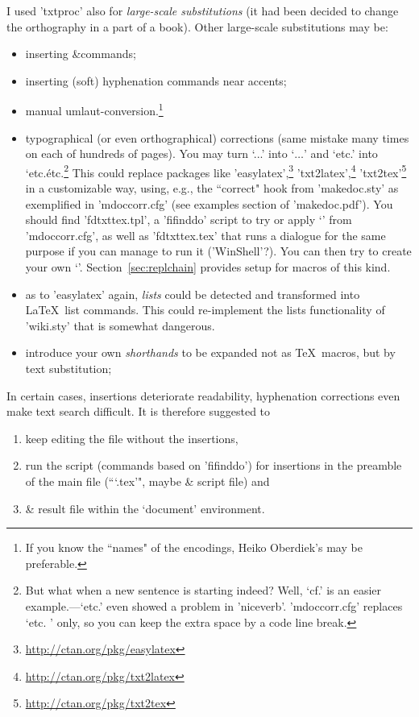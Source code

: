 \documentclass[fleqn]{article}
\begin{document}
I used 'txtproc' also for \emph{large-scale substitutions} 
(it had been decided to change the orthography in a part of a book).
Other large-scale substitutions may be: 
\begin{itemize}
\item inserting &\index commands;
\item inserting (soft) hyphenation commands near accents; 
\item manual umlaut-conversion.\footnote{If you know the ``names" 
        of the encodings, Heiko Oberdiek's 
        may be preferable.}
\item typographical (or even orthographical) corrections (same mistake 
      many times on each of hundreds of pages). 
      You may turn `...' into `$\dots$' and `etc.' into `etc.\' 
      etc.\footnote{But what when a new sentence is starting indeed? 
        Well, `cf.' is an easier example.---`etc.' even showed 
        a problem in 'niceverb'. 'mdoccorr.cfg' replaces `etc. ' 
        only, so you can keep the extra space by a code line break.}
      This could replace packages like 
      'easylatex',\footnote{\url{http://ctan.org/pkg/easylatex}} 
      'txt2latex',\footnote{\url{http://ctan.org/pkg/txt2latex}} 
      'txt2tex'\footnote{\url{http://ctan.org/pkg/txt2tex}} 
      in a customizable way, using, e.g., the ``correct"
      hook from 'makedoc.sty' as exemplified in 'mdoccorr.cfg' 
      (see examples section of 'makedoc.pdf'). 
      You should find 'fdtxttex.tpl', a 'fifinddo' script 
      to try or apply `\MakeDocCorrectHook' from 'mdoccorr.cfg', 
      as well as 'fdtxttex.tex' that runs a dialogue for the 
      same purpose if you can manage to run it ('WinShell'?).
      You can then try to create your own `\MakeDocCorrectHook'. 
      Section~\ref{sec:replchain} provides setup for macros 
      of this kind. 
\item as to 'easylatex' again, \emph{lists} could be detected and 
      transformed into \LaTeX\ list commands. This could re-implement 
      the lists functionality of 'wiki.sty' that is somewhat 
      dangerous. %
\item introduce your own \emph{shorthands} to be expanded not as \TeX\ macros, 
      but by text substitution;
\end{itemize}
%
In certain cases, insertions deteriorate readability, hyphenation 
corrections even make text search difficult. 
It is therefore suggested to 
\begin{enumerate}
\item keep editing the file without the insertions, 
\item run the script (commands based on 'fifinddo') for insertions 
      in the preamble of the main file 
      (```\jobname.tex'", maybe & script file) and 
\item & result file within the `document' environment. 
\end{enumerate}
\end{document}
